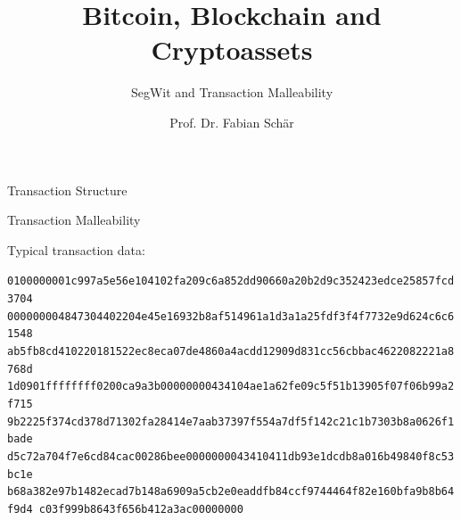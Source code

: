 \documentclass[]{beamer}
\title{Bitcoin, Blockchain and Cryptoassets}
\subtitle{SegWit and Transaction Malleability}
\author{Prof. Dr. Fabian Schär}
\institute{University of Basel}
\begin{document}
\thispagestyle{empty}
\begin{frame}[noframenumbering]
	\titlepage
\end{frame}

\begin{frame}{Transaction Structure}

\begin{figure}
		
\end{figure}
\vspace{1em}


\end{frame}

\begin{frame}{Transaction Malleability}

Typical transaction data:\\
\begin{scriptsize}
	\texttt{\textcolor{black!30}{0100000001c997a5e56e104102fa209c6a852dd90660a20b2d9c352423edce25857fcd3704
		00000000}{\alert{4847304402204e45e16932b8af514961a1d3a1a25fdf3f4f7732e9d624c6c61548
		ab5fb8cd410220181522ec8eca07de4860a4acdd12909d831cc56cbbac4622082221a8768d
		1d0901}}\textcolor{black!30}{ffffffff0200ca9a3b00000000434104ae1a62fe09c5f51b13905f07f06b99a2f715
		9b2225f374cd378d71302fa28414e7aab37397f554a7df5f142c21c1b7303b8a0626f1bade
		d5c72a704f7e6cd84cac00286bee0000000043410411db93e1dcdb8a016b49840f8c53bc1e
		b68a382e97b1482ecad7b148a6909a5cb2e0eaddfb84ccf9744464f82e160bfa9b8b64f9d4
		c03f999b8643f656b412a3ac00000000}}
\end{scriptsize}
	\vspace{1em}
	
\end{frame}
\end{document}
